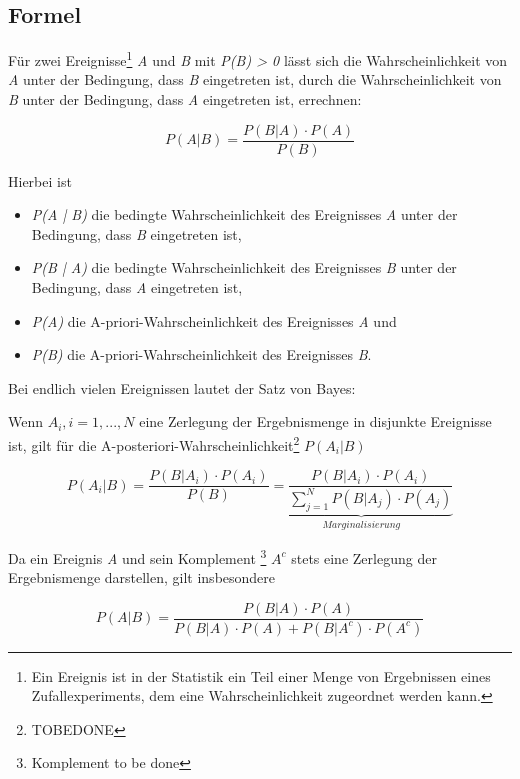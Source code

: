 \subsection{Formel}

Für zwei Ereignisse\footnote{Ein Ereignis ist in der Statistik ein Teil einer Menge von Ergebnissen eines Zufallexperiments, dem eine Wahrscheinlichkeit zugeordnet
    werden kann.} \textit{A} und \textit{B} mit \textit{P(B) > 0} lässt sich die Wahrscheinlichkeit von \textit{A} unter der Bedingung, dass \textit{B} eingetreten
ist, durch die Wahrscheinlichkeit von \textit{B} unter der Bedingung, dass \textit{A} eingetreten ist, errechnen:

\begin{equation}
    P(A | B) = \frac{P(B | A) \cdot P(A)}{P(B)}
\end{equation}

Hierbei ist

\begin{itemize}
    \item \textit{P(A | B)} die bedingte Wahrscheinlichkeit des Ereignisses \textit{A} unter der Bedingung, dass \textit{B} eingetreten ist,
    \item \textit{P(B | A)} die bedingte Wahrscheinlichkeit des Ereignisses \textit{B} unter der Bedingung, dass \textit{A} eingetreten ist,
    \item \textit{P(A)} die A-priori-Wahrscheinlichkeit des Ereignisses \textit{A} und
    \item \textit{P(B)} die A-priori-Wahrscheinlichkeit des Ereignisses \textit{B}.
\end{itemize}

Bei endlich vielen Ereignissen lautet der Satz von Bayes:

Wenn \textit{$A_i, i = 1,..., N$} eine Zerlegung der Ergebnismenge in disjunkte Ereignisse ist, gilt für die A-posteriori-Wahrscheinlichkeit\footnote{TOBEDONE}
\textit{$P(A_i | B)$}

\begin{equation}
    P(A_i | B) = \frac{P(B | A_i) \cdot P(A_i)}{P(B)} \underbrace{= \frac{P(B | A_i) \cdot P(A_i)}{\sum_{j = 1}^{N} P(B | A_j) \cdot P(A_j)}}_{Marginalisierung}
\end{equation}

Da ein Ereignis \textit{A} und sein Komplement \footnote{Komplement to be done} \textit{$A^c$} stets eine Zerlegung der Ergebnismenge darstellen, gilt insbesondere

\begin{equation}
    P(A | B) = \frac{P(B | A) \cdot P(A)}{P(B | A) \cdot P(A) + P(B | A^c) \cdot P(A^c)}
\end{equation}

\cite[S.411f]{Papula:2014}
